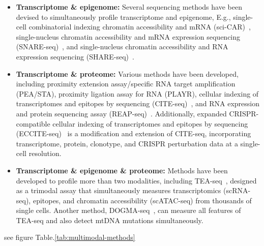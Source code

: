 \begin{itemize}
	\item \textbf{Transcriptome \& epigenome:}
	Several sequencing methods have been devised to simultaneously profile transcriptome and epigenome, E.g., single-cell combinatorial indexing chromatin accessibility and mRNA (sci-CAR)~\citep{cao2018scicar}, single-nucleus chromatin accessibility and mRNA expression sequencing (SNARE-seq)~\citep{chen2019SNARE}, and single-nucleus chromatin accessibility and RNA expression sequencing (SHARE-seq)~\citep{ma2020shareseq}.


	\item \textbf{Transcriptome \& proteome:}
	Various methods have been developed, including proximity extension assay/specific RNA target amplification (PEA/STA), proximity ligation assay for RNA (PLAYR), cellular indexing of transcriptomes and epitopes by sequencing (CITE-seq)~\citep{stoeckius2017citeseq}, and RNA expression and protein sequencing assay (REAP-seq)~\citep{peterson2017reapseq}. Additionally, expanded CRISPR-compatible cellular indexing of transcriptomes and epitopes by sequencing (ECCITE-seq)~\citep{mimitou2019ECCITE} is a modification and extension of CITE-seq, incorporating transcriptome, protein, clonotype, and CRISPR perturbation data at a single-cell resolution.


	\item \textbf{Transcriptome \& epigenome \& proteome:}
	Methods have been developed to profile more than two modalities, including TEA-seq~\citep{swanson2021simultaneous}, designed as a trimodal assay that simultaneously measures transcriptomics (scRNA-seq), epitopes, and chromatin accessibility (scATAC-seq) from thousands of single cells. Another method, DOGMA-seq~\citep{mimitou2021scalable}, can measure all features of TEA-seq and also detect mtDNA mutations simultaneously.

\end{itemize}

see figure Table.\ref{tab:multimodal-methods}

